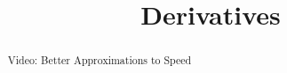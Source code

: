 \documentclass[handout]{ximera}
\title{Derivatives}
\begin{document}
\begin{abstract} Video: Better Approximations to Speed %
\end{abstract}

\maketitle

\end{document}
